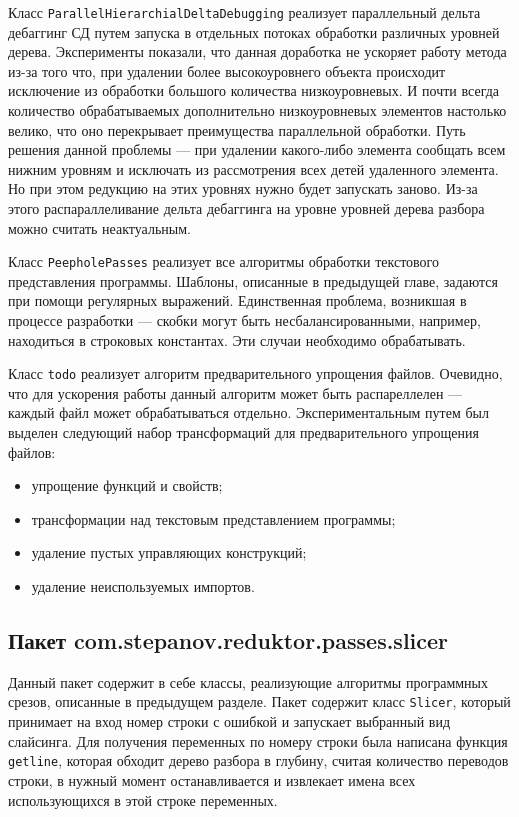 Класс \texttt{ParallelHierarchialDeltaDebugging} реализует параллельный дельта дебаггинг СД путем запуска в отдельных потоках обработки различных уровней дерева. Эксперименты показали, что данная доработка не ускоряет работу метода из-за того что, при удалении более высокоуровнего объекта происходит исключение из обработки большого количества низкоуровневых. И почти всегда количество обрабатываемых дополнительно низкоуровневых элементов настолько велико, что оно перекрывает преимущества параллельной обработки. Путь решения данной проблемы --- при удалении какого-либо элемента сообщать всем нижним уровням и исключать из рассмотрения всех детей удаленного элемента. Но при этом редукцию на этих уровнях нужно будет запускать заново. Из-за этого распараллеливание дельта дебаггинга на уровне уровней дерева разбора можно считать неактуальным. 

Класс \texttt{PeepholePasses} реализует все алгоритмы обработки текстового представления программы. Шаблоны, описанные в предыдущей главе, задаются при помощи регулярных выражений. Единственная проблема, возникшая в процессе разработки --- скобки могут быть несбалансированными, например, находиться в строковых константах. Эти случаи необходимо обрабатывать.

Класс \texttt{todo} реализует алгоритм предварительного упрощения файлов. Очевидно, что для ускорения работы данный алгоритм может быть распареллелен --- каждый файл может обрабатываться отдельно. Экспериментальным путем был выделен следующий набор трансформаций для предварительного упрощения файлов:
\begin{itemize}
	\item упрощение функций и свойств;
	\item трансформации над текстовым представлением программы;
	\item удаление пустых управляющих конструкций;
	\item удаление неиспользуемых импортов.
\end{itemize}


\subsection{Пакет com.stepanov.reduktor.passes.slicer}
Данный пакет содержит в себе классы, реализующие алгоритмы программных срезов, описанные в предыдущем разделе. Пакет содержит класс \texttt{Slicer}, который принимает на вход номер строки с ошибкой и запускает выбранный вид слайсинга. Для получения переменных по номеру строки была написана функция \texttt{getline}, которая обходит дерево разбора в глубину, считая количество переводов строки, в нужный момент останавливается и извлекает имена всех использующихся в этой строке переменных. 

